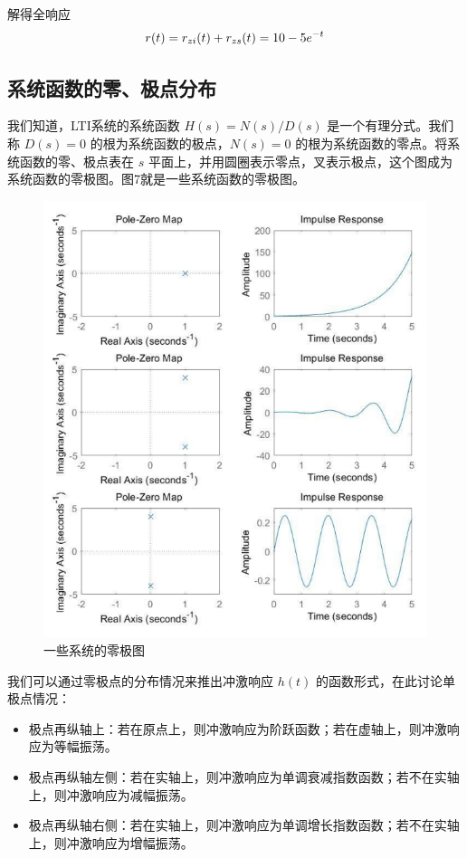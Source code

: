 \documentclass[UTF8,a4paper,11pt]{article}
\begin{document}
解得全响应
\begin{equation}
r(t)=r_{zi}(t)+r_{zs}(t)=10-5e^{-t}
\notag
\end{equation}

\subsection{系统函数的零、极点分布}
我们知道，LTI系统的系统函数 $H(s)=N(s)/D(s)$ 是一个有理分式。我们称 $D(s)=0$ 的根为系统函数的极点，$N(s)=0$ 的根为系统函数的零点。将系统函数的零、极点表在 $s$ 平面上，并用圆圈表示零点，叉表示极点，这个图成为系统函数的零极图。图7就是一些系统函数的零极图。
\begin{figure}[htbp]
\centering
\includegraphics[scale=0.9]{p7.png}
\caption{一些系统的零极图}
\end{figure}

我们可以通过零极点的分布情况来推出冲激响应 $h(t)$ 的函数形式，在此讨论单极点情况：
\begin{itemize}
\item 极点再纵轴上：若在原点上，则冲激响应为阶跃函数；若在虚轴上，则冲激响应为等幅振荡。
\item 极点再纵轴左侧：若在实轴上，则冲激响应为单调衰减指数函数；若不在实轴上，则冲激响应为减幅振荡。
\item 极点再纵轴右侧：若在实轴上，则冲激响应为单调增长指数函数；若不在实轴上，则冲激响应为增幅振荡。
\end{itemize} 
\end{document}
